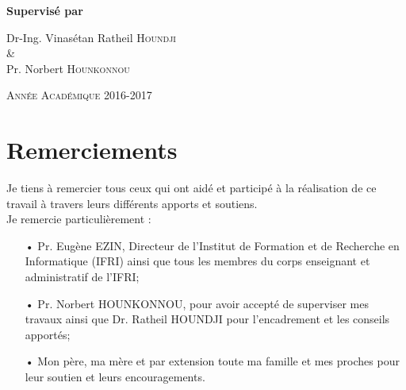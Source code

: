 \documentclass[12pt,a4paper]{article}
\begin{document}
\begin{titlepage}
		\vspace{1cm}{\scshape\Large Institut de Formation et de Recherche en Informatique (IFRI)\par}
		\vspace{1cm}{\scshape\Large Mémoire pour l'obtention du diplôme de Master en Systèmes d'Information et Réseaux Informatiques\par}
		\vspace{1.5cm}{\huge\bfseries Résolution de "Pigment Sequencing Problem" avec les algorithmes génétiques\par}
		\vfill
		\Large\textbf{Supervisé par}\par Dr-Ing. Vinasétan Ratheil \textsc{Houndji} \\ \& \\ Pr. Norbert \textsc{Hounkonnou} 
		\vfill
		{\large \scshape Année Académique 2016-2017 \par}
	\end{titlepage}

	\newpage
	\thispagestyle{empty}
	\null
	\newpage %
	
	\section*{Remerciements}
	
	\vspace{2.5cm}
	
	Je tiens à remercier tous ceux qui ont aidé et participé à la réalisation de ce travail à travers leurs différents apports et soutiens. \\
	\hspace*{.5cm}Je remercie particulièrement : \\
	\begin{itemize}
		\item[•] Pr. Eugène EZIN, Directeur de l'Institut de Formation et de Recherche en Informatique (IFRI) ainsi que tous les membres du corps enseignant et administratif de l'IFRI;
		\item[•] Pr. Norbert HOUNKONNOU, pour avoir accepté de superviser mes travaux ainsi que Dr. Ratheil HOUNDJI pour l'encadrement et les conseils apportés;
		\item[•] Mon père, ma mère et par extension toute ma famille et mes proches pour leur soutien et leurs encouragements. 
	\end{itemize}
	
\end{document}
